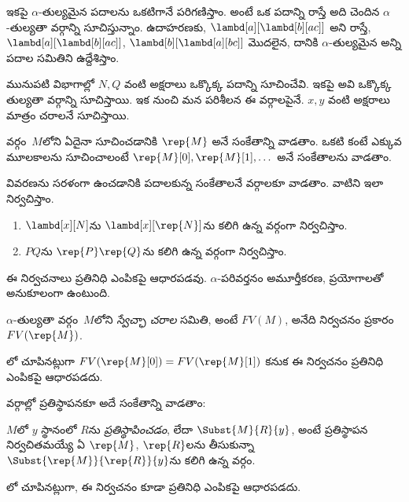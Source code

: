 \documentclass[../../../include/open-logic-section]{subfiles}
\begin{document}

ఇకపై $\alpha$-తుల్యమైన పదాలను ఒకటిగానే పరిగణిస్తాం. అంటే ఒక పదాన్ని
రాస్తే అది చెందిన $\alpha$-తుల్యతా వర్గాన్ని సూచిస్తున్నాం. ఉదాహరణకు, $\lambd[a][\lambd[b][a c]]$ అని
రాస్తే, $\lambd[a][\lambd[b][a c]]$,
$\lambd[b][\lambd[a][b c]]$ మొదలైన, దానికి
$\alpha$-తుల్యమైన అన్ని పదాల సమితిని ఉద్దేశిస్తాం.

మునుపటి విభాగాల్లో $N, Q$ వంటి అక్షరాలు ఒక్కొక్క పదాన్ని
సూచించేవి. ఇకపై అవి ఒక్కొక్క తుల్యతా వర్గాన్ని సూచిస్తాయి.
ఇక నుంచి మన పరిశీలన ఈ వర్గాలపైనే.
$x, y$ వంటి అక్షరాలు మాత్రం చరాలనే సూచిస్తాయి.

వర్గం~$M$లోని ఏదైనా  సూచించడానికి
$\rep{M}$ అనే సంకేతాన్ని వాడతాం. ఒకటి కంటే ఎక్కువ మూలకాలను సూచించాలంటే
$\rep{M}[0], \rep{M}[1], \dots$ అనే సంకేతాలను వాడతాం.

వివరణను సరళంగా ఉంచడానికి పదాలకున్న సంకేతాలనే వర్గాలకూ
వాడతాం. వాటిని ఇలా నిర్వచిస్తాం.
\begin{defn}
  \begin{enumerate}
  \item $\lambd[x][N]$ను $\lambd[x][\rep{N}]$ను కలిగి ఉన్న
    వర్గంగా నిర్వచిస్తాం.
  \item $PQ$ను $\rep{P}\rep{Q}$ను కలిగి ఉన్న వర్గంగా నిర్వచిస్తాం.
  \end{enumerate}
\end{defn}

ఈ నిర్వచనాలు ప్రతినిధి ఎంపికపై ఆధారపడవు.
$\alpha$-పరివర్తనం అమూర్తీకరణ, ప్రయోగాలతో అనుకూలంగా ఉంటుంది.

\begin{defn} 
  $\alpha$-తుల్యతా వర్గం~$M$లోని \emph{స్వేచ్ఛా చరాల} సమితి,
  అంటే $FV(M)$, అనేది నిర్వచనం ప్రకారం $FV(\rep{M})$.
\end{defn}

లో చూపినట్లుగా $FV(\rep{M}[0]) =
FV(\rep{M}[1])$ కనుక ఈ నిర్వచనం ప్రతినిధి ఎంపికపై ఆధారపడదు.

వర్గాల్లో ప్రతిస్థాపనకూ అదే సంకేతాన్ని వాడతాం:
\begin{defn} 
  $M$లో $y$ స్థానంలో $R$ను \emph{ప్రతిస్థాపించడం}, లేదా
  $\Subst{M}{R}{y}$, అంటే ప్రతిస్థాపన నిర్వచితమయ్యే ఏ
  $\rep{M}$, $\rep{R}$లను తీసుకున్నా
  $\Subst{\rep{M}}{\rep{R}}{y}$ను కలిగి ఉన్న వర్గం.
\end{defn}

లో చూపినట్లుగా, ఈ నిర్వచనం కూడా ప్రతినిధి ఎంపికపై
ఆధారపడదు.
%
\end{document}
